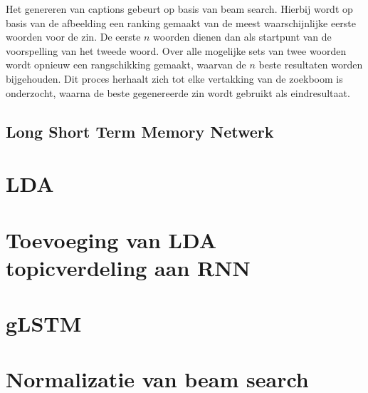 Het genereren van captions gebeurt op basis van beam search. Hierbij wordt op basis van de afbeelding een ranking gemaakt van de meest waarschijnlijke eerste woorden voor de zin. De eerste $n$ woorden dienen dan als startpunt van de voorspelling van het tweede woord. Over alle mogelijke sets van twee woorden wordt opnieuw een rangschikking gemaakt, waarvan de $n$ beste resultaten worden bijgehouden. Dit proces herhaalt zich tot elke vertakking van de zoekboom is onderzocht, waarna de beste gegenereerde zin wordt gebruikt als eindresultaat.


\subsection{Long Short Term Memory Netwerk}

\section{LDA}

\section{Toevoeging van LDA topicverdeling aan RNN}

\section{gLSTM}



\section{Normalizatie van beam search}
